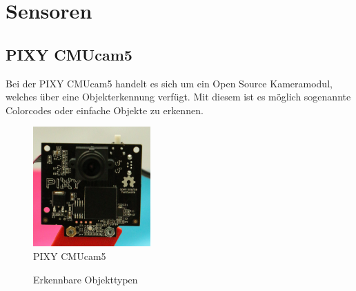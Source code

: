 \chapter{Sensoren}
\renewcommand{\kapitelautor}{Autor: Lucas Ullrich}

\section{PIXY CMUcam5}\label{PIXY_Headline}
Bei der PIXY CMUcam5 handelt es sich um ein Open Source Kameramodul, welches über eine Objekterkennung verfügt.
Mit diesem ist es möglich sogenannte Colorcodes oder einfache Objekte zu erkennen.

\begin{figure}[H]
  \begin{centering}
    \includegraphics[width = 0.4\textwidth]{Bilder/Pixy_CMUcam5}
  \par\end{centering}
  \caption{PIXY CMUcam5}
  \label{PIXY}
\end{figure}

\begin{figure}[H]
  \begin{centering}
  \par\end{centering}
  \caption{Erkennbare Objekttypen}
  \label{PIXY_Objekte}
\end{figure}

